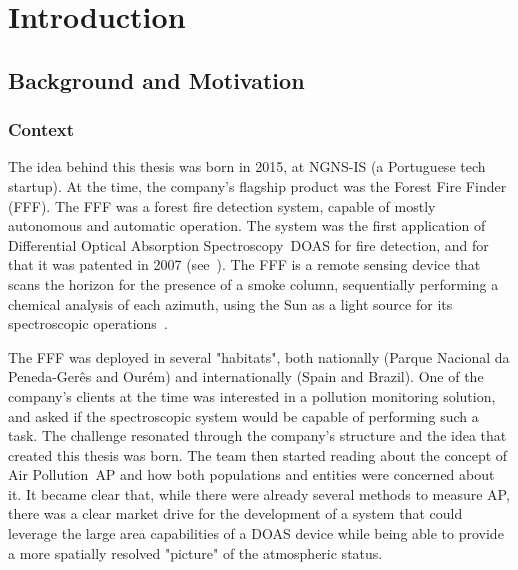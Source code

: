 \newcommand{\novathesis}{\emph{novathesis}}
\newcommand{\novathesisclass}{\texttt{novathesis.cls}}


\chapter{Introduction}
\label{cha:introduction}

\section{Background and Motivation}%
\label{sec:bg_and_motivation}

\subsection{Context}%
\label{sub:context}

The idea behind this thesis was born in 2015, at NGNS-IS (a Portuguese
tech startup). At the time, the company's flagship product was the
Forest Fire Finder (\gls{FFF}). The \gls{FFF} was a forest fire
detection system, capable of mostly autonomous and automatic operation.
The system was the first application of Differential Optical Absorption
Spectroscopy~\gls{DOAS} for fire detection, and for that it was patented
in 2007 (see~\cite{Vieira2007, Application2008}). The \gls{FFF} is a
remote sensing device that scans the horizon for the presence of a smoke
column, sequentially performing a chemical analysis of each azimuth,
using the Sun as a light source for its spectroscopic
operations~\cite{ValentedeAlmeida2017}.

The \gls{FFF} was deployed in several "habitats", both nationally
(Parque Nacional da Peneda-Gerês and Ourém) and internationally (Spain
and Brazil). One of the company's clients at the time was interested in
a pollution monitoring solution, and asked if the spectroscopic system
would be capable of performing such a task. The challenge resonated
through the company's structure and the idea that created this thesis
was born. The team then started reading about the concept of Air
Pollution~\gls{AP} and how both populations and entities were concerned
about it. It became clear that, while there were already several methods
to measure \gls{AP}, there was a clear market drive for the development
of a system that could leverage the large area capabilities of a
\gls{DOAS} device while being able to provide a more spatially resolved
"picture" of the atmospheric status.

